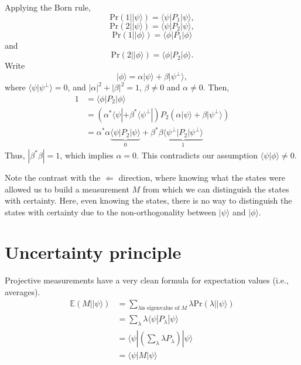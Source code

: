 \documentclass{article}
\newcommand{\ket}[1]{|#1\rangle}
\newcommand{\bra}[1]{\langle#1|}
\newcommand{\braket}[2]{\langle#1|#2\rangle}
\begin{document}
Applying the Born rule,
$$ \mathrm{Pr}(1 | \ket \psi) = \braket{\psi | P_1}{\psi},$$
$$ \mathrm{Pr}(2 | \ket \psi) = \braket{\psi | P_2}{\psi},$$
$$ \mathrm{Pr}(1 | \ket \phi) = \braket{\phi | P_1}{\phi}$$
and
$$ \mathrm{Pr}(2 | \ket \phi) = \braket{\phi | P_2}{\phi}.$$
Write $$ \ket \phi = \alpha \ket \psi + \beta \ket{\psi^{\perp}},$$
where $\braket{\psi}{\psi^{\perp}} = 0$, and $|\alpha|^2 + |\beta|^2 = 1$,
$\beta \neq 0$ and $\alpha \neq 0$.  
Then,
\begin{align*}
     1 &= \braket{\phi | P_2}{\phi} \\
       &= (\alpha^*\bra \psi + \beta^* \bra{\psi^{\perp}}) 
          P_2 (\alpha \ket \psi + \beta \ket{\psi^{\perp}}) \\
       &= \alpha^* \alpha \underbrace{\braket{\psi | P_2}{\psi}}_{0} + 
       \beta^* \beta 
       \underbrace{\braket{\psi^{\perp} | P_2}{\psi^{\perp}}}_{1}
\end{align*}
Thus, $|\beta^* \beta| = 1$, which implies $\alpha = 0$. 
This contradicts our assumption $\braket{\psi}{\phi} \neq 0$.

Note the contrast with the $\Leftarrow$ direction, where
knowing what the states were allowed us to build a measurement
$M$ from which we can distinguish the states with certainty. 
Here, even knowing the states, there is no way
to distinguish the states with certainty due to the non-orthogonality
between $\ket \psi$ and $\ket \phi$.

\section{Uncertainty principle}

Projective measurements have a very clean formula for 
expectation values (i.e., averages).
\begin{align*}
     \mathbb E(M | \ket \psi) &= \sum_{\lambda \text{is eigenvalue of $M$}} 
                                 \lambda \mathrm{Pr}(\lambda | \ket \psi) \\
                              &= \sum_{\lambda} \lambda \braket{\psi | P_{\lambda}}{\psi} \\
                              &= \bra{\psi} 
                                 \left( \sum_{\lambda} \lambda P_{\lambda}
                                 \right)
                                 \ket{\psi} \\
                              &= \braket{\psi | M}{\psi}
\end{align*}
\end{document}
